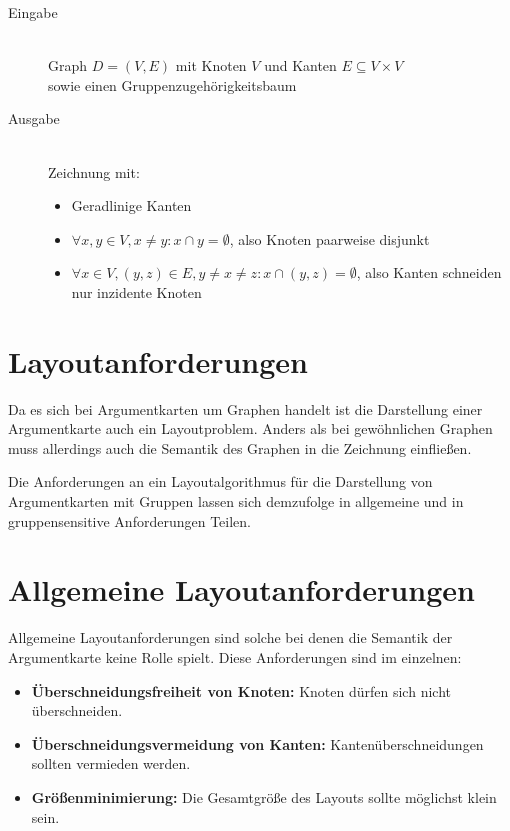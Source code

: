 \begin{description}
	\item[Eingabe] \hfill \\[0.3\baselineskip]
			Graph $D=(V,E)$ mit Knoten $V$ und Kanten $E \subseteq V \times V$ \hfill \\
			sowie einen Gruppenzugehörigkeitsbaum 
	
	
	\item[Ausgabe] \hfill \\[0.3\baselineskip]
		Zeichnung mit:
		\begin{itemize}
		\item Geradlinige Kanten
		\item $\forall x,y\in V, x \neq y: x \cap y = \emptyset$, also Knoten paarweise disjunkt
		\item $\forall x \in V, (y,z) \in E, y\neq x\neq z: x \cap (y,z) = \emptyset$, also Kanten schneiden nur inzidente Knoten
	\end{itemize}
\end{description}

\section{Layoutanforderungen}
Da es sich bei Argumentkarten um Graphen handelt ist die Darstellung einer Argumentkarte auch ein Layoutproblem.
Anders als bei gewöhnlichen Graphen muss allerdings auch die Semantik des Graphen in die Zeichnung einfließen.

Die Anforderungen an ein Layoutalgorithmus für die Darstellung von Argumentkarten mit Gruppen lassen sich demzufolge in allgemeine und in gruppensensitive Anforderungen Teilen.

\section{Allgemeine Layoutanforderungen}
\label{sec:generalreq}
Allgemeine Layoutanforderungen sind solche bei denen die Semantik der Argumentkarte keine Rolle spielt.
Diese Anforderungen sind im einzelnen:

\begin{itemize}
\item {\normalfont \bfseries{Überschneidungsfreiheit von Knoten:}} \newline Knoten dürfen sich nicht überschneiden.
\item {\normalfont \bfseries{Überschneidungsvermeidung von Kanten:}}  \newline Kantenüberschneidungen sollten vermieden werden.
\item {\normalfont \bfseries{Größenminimierung:}} \newline Die Gesamtgröße des Layouts sollte möglichst klein sein.
\end{itemize}

